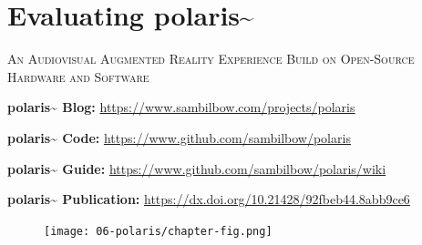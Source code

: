 \chapter{Evaluating polaris\textasciitilde{}}\label{sec: polaris}
\begin{flushright}
    \Large\textsc{An Audiovisual Augmented Reality Experience Build on Open-Source Hardware and Software}
\end{flushright}
\begin{SingleSpace}
    \noindent\textbf{polaris\textasciitilde{} Blog: } \url{https://www.sambilbow.com/projects/polaris}
    
    \noindent\textbf{polaris\textasciitilde{} Code: } \url{https://www.github.com/sambilbow/polaris}
    
    \noindent\textbf{polaris\textasciitilde{} Guide: } \url{https://www.github.com/sambilbow/polaris/wiki}
    
    \noindent\textbf{polaris\textasciitilde{} Publication: } \url{https://dx.doi.org/10.21428/92fbeb44.8abb9ce6}
\end{SingleSpace}

\begin{figure}
    \centering
    \texttt{[image: 06-polaris/chapter-fig.png]}
    \captionsetup{labelformat=empty}
    \caption[\autoref*{sec: polaris}'s page-figure: Experience Study of \textit{polaris\textasciitilde{}} at the Sussex Humanities Lab, (from \citeauthor{bilbow2022}, \citeyear{bilbow2022})]{}
\end{figure}

